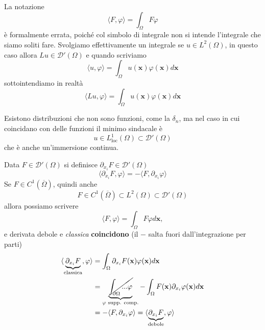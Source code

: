 \documentclass[10pt,a4paper,twoside,openright]{book}
\newcommand{\x}{\mathbf{x}}
\begin{document}
\begin{nb}
	La notazione 
	\begin{equation*}
		\langle F,\varphi \rangle =\int _{\Omega } F\varphi 
	\end{equation*}
	è formalmente errata, poiché col simbolo di integrale non si intende l'integrale che siamo soliti fare. Svolgiamo effettivamente un integrale se $\displaystyle u\in L^{2}( \Omega )$, in questo caso allora $\displaystyle Lu\in \mathcal{D} '( \Omega )$ e quando scriviamo 
	\begin{equation*}
		\langle u,\varphi \rangle =\int _{\Omega } u(\x) \varphi (\x) d\x
	\end{equation*}
	sottointendiamo in realtà
	\begin{equation*}
		\langle Lu,\varphi \rangle =\int _{\Omega } u(\x) \varphi (\x) d\x
	\end{equation*}
\end{nb}
Esistono distribuzioni che non sono funzioni, come la $\displaystyle \delta _{n}$, ma nel caso in cui coincidano con delle funzioni il minimo sindacale è \ 
\begin{equation*}
	u\in L^{1}_{\text{loc}}( \Omega ) \subset \mathcal{D} '( \Omega )
\end{equation*}
che è anche un'immersione continua.
\begin{definition}
	 Data $\displaystyle F\in \mathcal{D}'( \Omega )$ si definisce $\displaystyle \partial _{x_{i}} F\in \mathcal{D} '( \Omega )$
	\begin{equation*}
		\langle \partial _{x_{i}} F,\varphi \rangle =-\langle F,\partial _{x_{i}} \varphi \rangle 
	\end{equation*}
	Se $\displaystyle F\in C^{1}(\overline{\Omega })$, quindi anche
	\begin{equation*}
		F\in C^{1}(\overline{\Omega }) \subset L^{2}(\Omega )\mathcal{\subset D} '( \Omega )
	\end{equation*}
	allora possiamo scrivere
	\begin{equation*}
		\langle F,\varphi \rangle =\int _{\Omega } F\varphi d\x ,
	\end{equation*}
	e derivata debole e \textit{classica} \textbf{coincidono} (il $-$ salta fuori dall'integrazione per parti)
	\begin{align*}
		\langle \underbrace{\partial _{x_{i}} F}_{\text{classica}} ,\varphi \rangle & =\int _{\Omega } \partial _{x_{i}} F(\x) \varphi (\x) d\x                                                                              \\
		                                                                            & =\underbrace{\cancel{\int _{\partial \Omega } ...\varphi }}_{\varphi \text{ supp. comp.}} -\int _{\Omega } F(\x) \partial _{x_{i}} \varphi (\x)d\x \\
		                                                                            & =-\langle F,\partial _{x_{i}} \varphi\rangle =\langle \underbrace{\partial _{x_{i}} F}_{\text{debole}} ,\varphi \rangle                                              
	\end{align*}
\end{definition}
\end{document}
